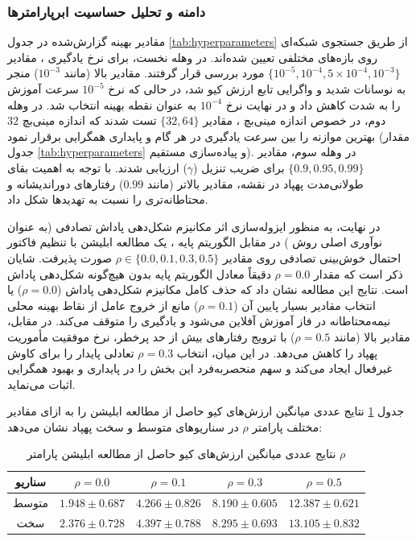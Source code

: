 \documentclass[oneside,openany,a4paper,12pt]{article}
\begin{document}
\subsubsection{دامنه و تحلیل حساسیت ابرپارامترها}
مقادیر بهینه گزارش‌شده در جدول \ref{tab:hyperparameters} از طریق جستجوی شبکه‌ای  روی بازه‌های مختلفی تعیین شده‌اند. در وهله نخست، برای نرخ یادگیری ، مقادیر \mbox{$\{10^{-5}, 10^{-4}, 5 \times 10^{-4}, 10^{-3}\}$} مورد بررسی قرار گرفتند. مقادیر بالا (مانند $10^{-3}$) منجر به نوسانات شدید و واگرایی تابع ارزش کیو شد، در حالی که نرخ $10^{-5}$ سرعت آموزش را به شدت کاهش داد و در نهایت نرخ $10^{-4}$ به عنوان نقطه بهینه انتخاب شد. در وهله دوم، در خصوص اندازه مینی‌بچ ، مقادیر \mbox{$\{32, 64\}$} تست شدند که اندازه مینی‌بچ $32$ بهترین موازنه را بین سرعت یادگیری در هر گام و پایداری همگرایی برقرار نمود (مقدار جدول \ref{tab:hyperparameters} و پیاده‌سازی مستقیم). در وهله سوم، مقادیر \mbox{$\{0.9, 0.95, 0.99\}$} برای ضریب تنزیل ($\gamma$) ارزیابی شدند. با توجه به اهمیت بقای طولانی‌مدت پهپاد در نقشه، مقادیر بالاتر (مانند $0.99$) رفتارهای دوراندیشانه و محتاطانه‌تری را نسبت به تهدیدها شکل داد.


در نهایت، به منظور ایزوله‌سازی اثر مکانیزم شکل‌دهی پاداش تصادفی (به عنوان نوآوری اصلی روش ) در مقابل الگوریتم پایه ، یک مطالعه ابلیشن  با تنظیم فاکتور احتمال خوش‌بینی تصادفی روی مقادیر \mbox{$\rho \in \{0.0, 0.1, 0.3, 0.5\}$} صورت پذیرفت. شایان ذکر است که مقدار $\rho = 0.0$ دقیقاً معادل الگوریتم  پایه بدون هیچ‌گونه شکل‌دهی پاداش است. نتایج این مطالعه نشان داد که حذف کامل مکانیزم شکل‌دهی پاداش ($\rho=0.0$) یا انتخاب مقادیر بسیار پایین آن ($\rho=0.1$) مانع از خروج عامل از نقاط بهینه محلی نیمه‌محتاطانه در فاز آموزش آفلاین می‌شود و یادگیری را متوقف می‌کند. در مقابل، مقادیر بالا (مانند $\rho=0.5$) با ترویج رفتارهای بیش از حد پرخطر، نرخ موفقیت مأموریت پهپاد را کاهش می‌دهد. در این میان، انتخاب $\rho=0.3$ تعادلی پایدار را برای کاوش غیرفعال ایجاد می‌کند و سهم منحصربه‌فرد این بخش را در پایداری و بهبود همگرایی اثبات می‌نماید.

جدول \ref{tab:ablation_results} نتایج عددی میانگین ارزش‌های کیو حاصل از مطالعه ابلیشن را به ازای مقادیر مختلف پارامتر $\rho$ در سناریوهای متوسط و سخت پهپاد نشان می‌دهد:
\begin{table}[H]
\centering
\caption{نتایج عددی میانگین ارزش‌های کیو حاصل از مطالعه ابلیشن پارامتر $\rho$}
\label{tab:ablation_results}
\begin{tabular}{ccccc}
\hline
\textbf{سناریو} & \textbf{$\rho = 0.0$} & \textbf{$\rho = 0.1$} & \textbf{$\rho = 0.3$} & \textbf{$\rho = 0.5$} \\ \hline
متوسط & $1.948 \pm 0.687$ & $4.266 \pm 0.826$ & $8.190 \pm 0.605$ & $12.387 \pm 0.621$ \\
سخت & $2.376 \pm 0.728$ & $4.397 \pm 0.788$ & $8.295 \pm 0.693$ & $13.105 \pm 0.832$ \\ \hline
\end{tabular}
\end{table}
\end{document}

